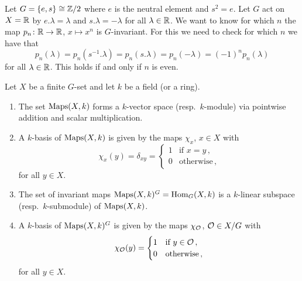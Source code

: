 \begin{example}
  Let $G = \{e,s\} \cong \mathbb{Z}/2$ where $e$ is the neutral element and $s^2 = e$.
  Let $G$ act on $X = \mathbb{R}$ by $e.\lambda = \lambda$ and $s.\lambda = -\lambda$ for all $\lambda \in \mathbb{R}$.
  We want to know for which $n$ the map $p_n \colon \mathbb{R} \to \mathbb{R}$, $x \mapsto x^n$ is $G$-invariant.
  For this we need to check for which $n$ we have that
  \[
      p_n(\lambda)
    = p_n\left( s^{-1}.\lambda \right)
    = p_n(s.\lambda)
    = p_n(-\lambda)
    = (-1)^n p_n(\lambda)
  \]
  for all $\lambda \in \mathbb{R}$.
  This holds if and only if $n$ is even.
\end{example}


\begin{lemma}\label{lemma: basis of Maps and Hom}
  Let $X$ be a finite $G$-set and let $k$ be a field (or a ring).
  \begin{enumerate}
    \item
      The set $\operatorname{Maps}(X,k)$ forms a $k$-vector space (resp.\ $k$-module) via pointwise addition and scalar multiplication.
    \item
      A $k$-basis of $\operatorname{Maps}(X,k)$ is given by the maps $\chi_x$, $x \in X$ with
      \[
          \chi_x(y)
        = \delta_{xy}
        = \begin{cases}
            1 & \text{if $x = y$} \,, \\
            0 & \text{otherwise}  \,,
          \end{cases}
      \]
      for all $y \in X$.
    \item
      The set of invariant maps $\operatorname{Maps}(X,k)^G = \operatorname{Hom}_G(X,k)$ is a $k$-linear subspace (resp.\ $k$-submodule) of $\operatorname{Maps}(X,k)$.
    \item
      A $k$-basis of $\operatorname{Maps}(X,k)^G$ is given by the maps $\chi_\mathcal{O}$, $\mathcal{O} \in X/G$ with
      \[
          \chi_\mathcal{O}(y)
        = \begin{cases}
            1 & \text{if $y \in \mathcal{O}$} \,,  \\
            0 & \text{otherwise} \,,
          \end{cases}
      \]
      for all $y \in X$.
  \end{enumerate}
\end{lemma}


